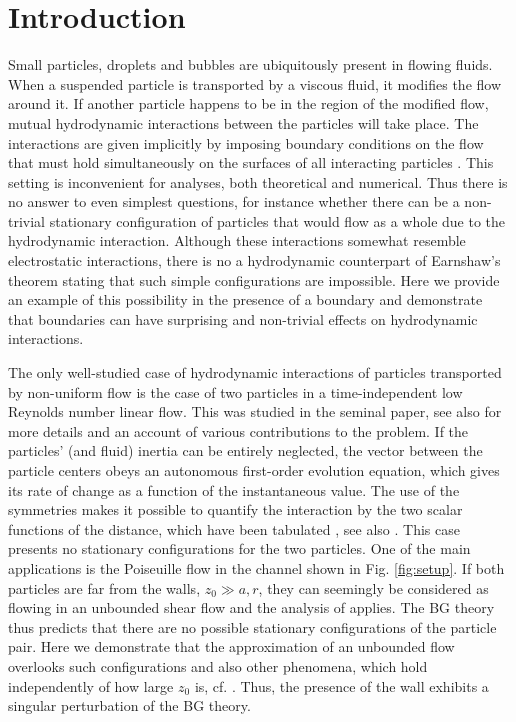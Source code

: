 

\section{Introduction}

Small particles, droplets and bubbles are ubiquitously present in flowing fluids. When a suspended particle is transported by a viscous fluid, it modifies the flow around it. If another particle happens to be in the region of the modified flow, mutual hydrodynamic interactions between the particles will take place. The interactions are given implicitly by imposing boundary conditions on the flow that must hold simultaneously on the surfaces of all interacting particles \citep{hb,kim_karrila}. This setting is inconvenient for analyses, both theoretical and numerical. Thus there is no answer to even simplest questions, for instance whether there can be a non-trivial stationary configuration of particles that would flow as a whole due to the hydrodynamic interaction. Although these interactions somewhat resemble electrostatic interactions, there is no a hydrodynamic counterpart of Earnshaw's theorem \citep{pur} stating that such simple configurations are impossible. Here we provide an example of this possibility in the presence of a boundary and demonstrate that boundaries can have surprising and  non-trivial effects on hydrodynamic interactions.

The only well-studied case of hydrodynamic interactions of particles transported by non-uniform flow is the case of two particles in a time-independent low Reynolds number linear flow. This was studied in the seminal \cite{batchelor_green_1972} paper, see also \cite{arp} for more details and an account of various contributions to the problem. If the particles' (and fluid) inertia can be entirely neglected, the vector between the particle centers obeys an autonomous first-order evolution equation, which gives its rate of change as a function of the instantaneous value. The use of the symmetries makes it possible to quantify the interaction by the two scalar functions of the distance, which have been tabulated \citep{batchelor_green_1972}, see also \cite{kim_karrila}. This case presents no stationary configurations for the two particles. One of the main applications is the Poiseuille flow in the channel shown in Fig. \ref{fig:setup}. If both particles are far from the walls, $z_0 \gg a, r$, they can seemingly be considered as flowing in an unbounded shear flow and the analysis of \cite{batchelor_green_1972,arp,lin_lee_sather_1970} applies. The BG theory thus predicts that there are no possible stationary configurations of the particle pair. Here we demonstrate that the approximation of an unbounded flow overlooks such configurations and also other phenomena, which hold independently of how large $z_0$ is, cf. \cite{zurita-gotor_2007}. Thus, the presence of the wall exhibits a singular perturbation of the BG theory.

